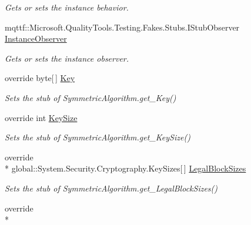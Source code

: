 \begin{DoxyCompactItemize}
\begin{DoxyCompactList}\small\item\em Gets or sets the instance behavior.\end{DoxyCompactList}\item 
mqttf\-::\-Microsoft.\-Quality\-Tools.\-Testing.\-Fakes.\-Stubs.\-I\-Stub\-Observer \hyperlink{class_system_1_1_security_1_1_cryptography_1_1_fakes_1_1_stub_symmetric_algorithm_ada82b34cf4083c916b8c7732af3c06ba}{Instance\-Observer}
\begin{DoxyCompactList}\small\item\em Gets or sets the instance observer.\end{DoxyCompactList}\item 
override byte\mbox{[}$\,$\mbox{]} \hyperlink{class_system_1_1_security_1_1_cryptography_1_1_fakes_1_1_stub_symmetric_algorithm_ab15a20157deb0d062b6939eaf174aa36}{Key}
\begin{DoxyCompactList}\small\item\em Sets the stub of Symmetric\-Algorithm.\-get\-\_\-\-Key()\end{DoxyCompactList}\item 
override int \hyperlink{class_system_1_1_security_1_1_cryptography_1_1_fakes_1_1_stub_symmetric_algorithm_a2a1a7619c3c2b318c2ffa5631ab2ba7a}{Key\-Size}
\begin{DoxyCompactList}\small\item\em Sets the stub of Symmetric\-Algorithm.\-get\-\_\-\-Key\-Size()\end{DoxyCompactList}\item 
override \\*
global\-::\-System.\-Security.\-Cryptography.\-Key\-Sizes\mbox{[}$\,$\mbox{]} \hyperlink{class_system_1_1_security_1_1_cryptography_1_1_fakes_1_1_stub_symmetric_algorithm_aa55e0370977534ded3edac63ef03095e}{Legal\-Block\-Sizes}
\begin{DoxyCompactList}\small\item\em Sets the stub of Symmetric\-Algorithm.\-get\-\_\-\-Legal\-Block\-Sizes()\end{DoxyCompactList}\item 
override \\*

\end{DoxyCompactItemize}
